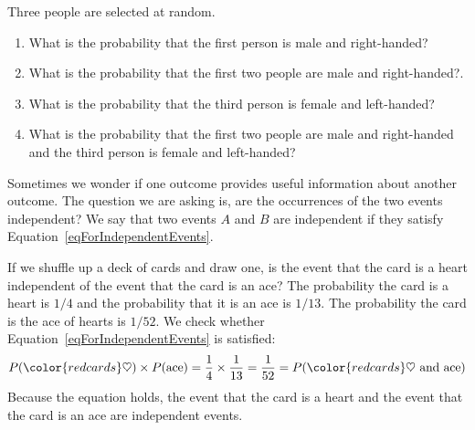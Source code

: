 \begin{exercisewrap}
\begin{nexercise}
Three people are selected at random.\footnotemark \vspace{-1.5mm}
\begin{enumerate}
\setlength{\itemsep}{0mm}
\item[(a)] What is the probability that the first person is male and right-handed?
\item[(b)] What is the probability that the first two people are male and right-handed?.
\item[(c)] What is the probability that the third person is female and left-handed?
\item[(d)] What is the probability that the first two people are male and right-handed and the third person is female and left-handed?
\end{enumerate}
\end{nexercise}
\end{exercisewrap}

Sometimes we wonder if one outcome provides useful information about another outcome. The question we are asking is, are the occurrences of the two events independent? We say that two events $A$ and $B$ are independent if they satisfy Equation~\eqref{eqForIndependentEvents}.

\begin{examplewrap}
\begin{nexample}{If we shuffle up a deck of cards and draw one, is the event that the card is a heart independent of the event that the card is an ace?}
The probability the card is a heart is $1/4$ and the probability that it is an ace is $1/13$. The probability the card is the ace of hearts is $1/52$. We check whether Equation~\ref{eqForIndependentEvents} is satisfied:
\begin{align*}
P({\color{redcards}\heartsuit})\times P(\text{ace}) = \frac{1}{4}\times \frac{1}{13} = \frac{1}{52}
					= P({\color{redcards}\heartsuit}\text{ and ace})
\end{align*}
Because the equation holds, the event that the card is a heart and the event that the card is an ace are independent events.
\end{nexample}
\end{examplewrap}


\D{\newpage}

